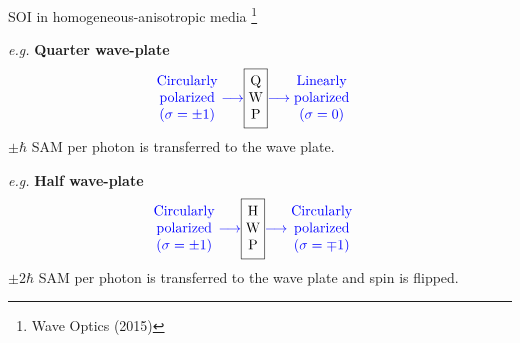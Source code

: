 \documentclass[12pt, dvipsnames]{beamer}
\numberwithin{equation}{section}
\newcommand\blfootnote[1]{%
	\begingroup
	\renewcommand\thefootnote{}\footnote{#1}%
	\addtocounter{footnote}{-1}%
	\endgroup
}
\begin{document}
\begin{frame}{SOI in homogeneous-anisotropic media} \blfootnote{Wave Optics (2015)}
	\textit{e.g.} \textbf{Quarter wave-plate}\pause
	\begin{align*}
		{\color{blue}\begin{matrix}
			\text{Circularly}\\
			\text{polarized}\\
			(\sigma=\pm1)
		\end{matrix}\longrightarrow}
		&\boxed{\begin{matrix}
			\text{Q}\\
			\text{W}\\
			\text{P}
		\end{matrix}}{\color{blue}\longrightarrow
		\begin{matrix}
			\text{Linearly}\\
			\text{polarized}\\
			(\sigma=0)
		\end{matrix}}
	\end{align*}\pause
	$\pm\hbar$ SAM per photon is transferred to the wave plate.\\\pause

	\textit{e.g.} \textbf{Half wave-plate}\pause
	\begin{align*}
		{\color{blue}\begin{matrix}
				\text{Circularly}\\
				\text{polarized}\\
				(\sigma=\pm1)
			\end{matrix}\longrightarrow}
		&\boxed{\begin{matrix}
				\text{H}\\
				\text{W}\\
				\text{P}
		\end{matrix}}{\color{blue}\longrightarrow
			\begin{matrix}
				\text{Circularly}\\
				\text{polarized}\\
				(\sigma=\mp1)
		\end{matrix}}
	\end{align*}\pause
	$\pm2\hbar$ SAM per photon is transferred to the wave plate and spin is flipped.
\end{frame}
\end{document}
